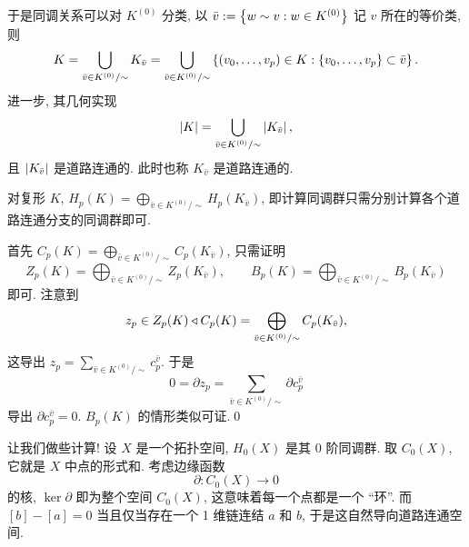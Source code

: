     于是同调关系可以对 $ K^{(0)} $ 分类, 以 $ \bar{v}:=\left\{ w\sim v : w\in K^{(0)} \right\} $ 记 $ v $ 所在的等价类, 则
    \[
        K=\bigcup_{\bar{v}\in K^{(0)}/\sim}K_{\bar{v}}=\bigcup_{\bar{v}\in K^{(0)}/\sim}\left\{ (v_0,\dots,v_p)\in K : \left\{ v_0,\dots,v_p \right\}\subset\bar{v} \right\}.
    \]
    进一步, 其几何实现
    \[
        \left| K \right| =\bigcup_{\bar{v}\in K^{(0)}/\sim}\left| K_{\bar{v}} \right| ,
    \]
    且 $ \left| K_{\bar{v}} \right|  $ 是道路连通的. 此时也称 $ K_{\bar{v}} $ 是道路连通的.

    \begin{Theorem}
        对复形 $ K $, $ H_p(K)=\bigoplus_{\bar{v}\in K^{(0)}/\sim}H_p(K_{\bar{v}}) $, 即计算同调群只需分别计算各个道路连通分支的同调群即可.
    \end{Theorem}
    \begin{Proof}
        首先 $ C_p(K)=\bigoplus_{\bar{v}\in K^{(0)}/\sim}C_p(K_{\bar{v}}) $, 只需证明
        \[
            Z_p(K)=\bigoplus_{\bar{v}\in K^{(0)}/\sim}Z_p(K_{\bar{v}}),\qquad B_p(K)=\bigoplus_{\bar{v}\in K^{(0)}/\sim}B_p(K_{\bar{v}})
        \]
        即可. 注意到
        \[
            z_p\in Z_p(K)\triangleleft C_p(K)=\bigoplus_{\bar{v}\in K^{(0)}/\sim}C_p(K_{\bar{v}}),
        \]
        这导出 $ z_p=\sum_{\bar{v}\in K^{(0)}/\sim}c_p^{\bar{v}} $. 于是
        \[
            0=\partial z_p=\sum_{\bar{v}\in K^{(0)}/\sim}\partial c_p^{\bar{v}}
        \]
        导出 $ \partial c_p^{\bar{v}}=0 $. $ B_p(K) $ 的情形类似可证.\qed
    \end{Proof}

    让我们做些计算! 设 $ X $ 是一个拓扑空间, $ H_0(X) $ 是其 0 阶同调群. 取 $ C_0(X) $, 它就是 $ X $ 中点的形式和. 考虑边缘函数
    \[
        \partial : C_0(X)\to 0
    \]
    的核, $ \ker\partial $ 即为整个空间 $ C_0(X) $, 这意味着每一个点都是一个 ``环''. 而 $ [b]-[a]=0 $ 当且仅当存在一个 1 维链连结 $ a $ 和 $ b $, 于是这自然导向道路连通空间.

